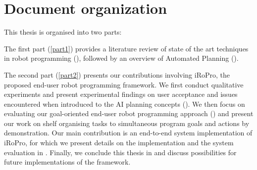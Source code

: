 \section{Document organization}
This thesis is organised into two parts:

The first part (\ref{part1}) provides a literature review of state of the art techniques in robot programming (\textbf{}), followed by an overview of Automated Planning (\textbf{}).

The second part (\ref{part2}) presents our contributions involving iRoPro, the proposed end-user robot programming framework. %
We first conduct qualitative experiments and present experimental findings on user acceptance and issues encountered when introduced to the AI planning concepts (\textbf{}).
We then focus on evaluating our goal-oriented end-user robot programming approach (\textbf{}) and present our work on shelf organising tasks to simultaneous program goals and actions by demonstration.
Our main contribution is an end-to-end system implementation of iRoPro, for which we present details on the implementation and the system evaluation in \textbf{}.
Finally, we conclude this thesis in \textbf{} and discuss possibilities for future implementations of the framework.

%


